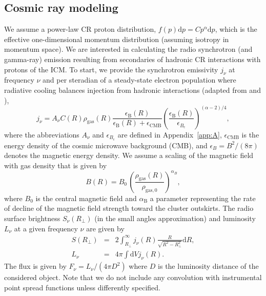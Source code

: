 \documentclass[traditabstract]{aa}
\newcommand{\rmn}{\mathrm}
\newcommand{\dd}{\mathrm{d}}
\begin{document}
\subsection{Cosmic ray modeling}
\label{sec:2.3}
We assume a power-law CR proton distribution, $f(p) \dd p=C p^\alpha \dd p$,
which is the effective one-dimensional momentum distribution (assuming isotropy
in momentum space). We are interested in calculating the radio synchrotron (and
gamma-ray) emission resulting from secondaries of hadronic CR interactions with
protons of the ICM. To start, we provide the synchrotron emissivity $j_{\nu}$ at
frequency $\nu$ and per steradian of a steady-state electron population where
radiative cooling balances injection from hadronic interactions (adapted from
\citealp{2008MNRAS.385.1211P} and \citealp{2011A&A...527A..99E}),
\begin{equation}
j_{\nu}  =  A_\nu C(R) \rho_{\rmn{gas}}(R) 
\frac{\epsilon_{\rmn{B}}(R)}{\epsilon_{\rmn{B}}(R)+\epsilon_{\rmn{CMB}}} 
\left( \frac{\epsilon_{\rmn{B}}(R)}{\epsilon_{B_{\rmn{c}}}} \right)^{(\alpha-2)/4},
\label{eq:jnu}
\end{equation}
where the abbreviations $A_\nu$ and $\epsilon_{B_{\rmn{c}}}$ are defined in
Appendix~\ref{app:A}, $\epsilon_{\rmn{CMB}}$ is the energy density of the cosmic
microwave background (CMB), and $\epsilon_B=B^{2}/(8\pi)$ denotes the magnetic
energy density. We assume a scaling of the magnetic field with gas density that
is given by
\begin{equation}
B(R) = B_0\,\left(\frac{\rho_{\rmn{gas}}(R)}{\rho_{\rmn{gas},0}}\right)^{\alpha_B},
\label{eq:B}
\end{equation}
where $B_0$ is the central magnetic field and $\alpha_{\rmn{B}}$ a parameter
representing the rate of decline of the magnetic field strength toward the
cluster outskirts. The radio surface brightness $S_{\nu}(R_{\perp})$ (in the small
angles approximation) and luminosity $L_{\nu}$ at a given frequency $\nu$ are given by
\begin{eqnarray}
S(R_{\perp}) &=& 2 \int_{R_{\perp}}^{\infty} j_{\nu}(R) \frac{R}{\sqrt{R^{2}-R_{\perp}^{2}}} \rmn{d}R, \label{eq:surf} \\
L_{\nu}  &=&  4 \pi \int \dd V j_\nu(R).
\label{eq:lum}
\end{eqnarray}
The flux is given by $F_{\nu}=L_{\nu}/(4\pi D^{2})$ where $D$ is the
luminosity distance of the considered object. Note that we do not
include any convolution with instrumental point spread functions 
unless differently specified.
\end{document}
